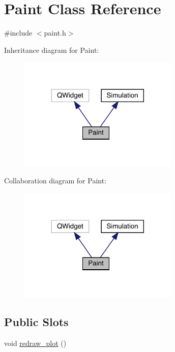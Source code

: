 \hypertarget{classPaint}{}\section{Paint Class Reference}
\label{classPaint}


{\ttfamily \#include $<$paint.\+h$>$}



Inheritance diagram for Paint\+:\nopagebreak
\begin{figure}[H]
\begin{center}
\leavevmode
\includegraphics[width=216pt]{classPaint__inherit__graph}
\end{center}
\end{figure}


Collaboration diagram for Paint\+:\nopagebreak
\begin{figure}[H]
\begin{center}
\leavevmode
\includegraphics[width=216pt]{classPaint__coll__graph}
\end{center}
\end{figure}
\subsection*{Public Slots}
\begin{DoxyCompactItemize}
\item 
void \mbox{\hyperlink{classPaint_ab32de795b250bd919ebc0d8ebead6440}{redraw\+\_\+plot}} ()
\end{DoxyCompactItemize}
